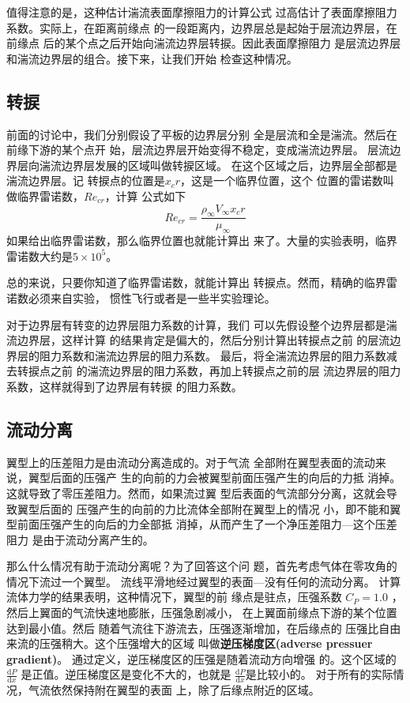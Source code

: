 值得注意的是，这种估计湍流表面摩擦阻力的计算公式
过高估计了表面摩擦阻力系数。实际上，在距离前缘点
的一段距离内，边界层总是起始于层流边界层，在前缘点
后的某个点之后开始向湍流边界层转捩。因此表面摩擦阻力
是层流边界层和湍流边界层的组合。接下来，让我们开始
检查这种情况。

\subsection{转捩}
前面的讨论中，我们分别假设了平板的边界层分别
全是层流和全是湍流。然后在前缘下游的某个点开
始，层流边界层开始变得不稳定，变成湍流边界层。
层流边界层向湍流边界层发展的区域叫做转捩区域。
在这个区域之后，边界层全部都是湍流边界层。记
转捩点的位置是$x_cr$，这是一个临界位置，这个
位置的雷诺数叫做临界雷诺数，$Re_{cr}$，计算
公式如下
\[
	Re_{cr}=\frac{\rho_\infty V_\infty x_cr}{\mu_\infty}
\]
如果给出临界雷诺数，那么临界位置也就能计算出
来了。大量的实验表明，临界雷诺数大约是$5\times 10^5 $。

总的来说，只要你知道了临界雷诺数，就能计算出
转捩点。然而，精确的临界雷诺数必须来自实验，
惯性飞行或者是一些半实验理论。

对于边界层有转变的边界层阻力系数的计算，我们
可以先假设整个边界层都是湍流边界层，这样计算
的结果肯定是偏大的，然后分别计算出转捩点之前
的层流边界层的阻力系数和湍流边界层的阻力系数。
最后，将全湍流边界层的阻力系数减去转捩点之前
的湍流边界层的阻力系数，再加上转捩点之前的层
流边界层的阻力系数，这样就得到了边界层有转捩
的阻力系数。

\subsection{流动分离}
翼型上的压差阻力是由流动分离造成的。对于气流
全部附在翼型表面的流动来说，翼型后面的压强产
生的向前的力会被翼型前面压强产生的向后的力抵
消掉。这就导致了零压差阻力。然而，如果流过翼
型后表面的气流部分分离，这就会导致翼型后面的
压强产生的向前的力比流体全部附在翼型上的情况
小，即不能和翼型前面压强产生的向后的力全部抵
消掉，从而产生了一个净压差阻力---这个压差阻力
是由于流动分离产生的。

那么什么情况有助于流动分离呢？为了回答这个问
题，首先考虑气体在零攻角的情况下流过一个翼型。
流线平滑地经过翼型的表面---没有任何的流动分离。
计算流体力学的结果表明，这种情况下，翼型的前
缘点是驻点，压强系数
$C_P=1.0$
，然后上翼面的气流快速地膨胀，压强急剧减小，
在上翼面前缘点下游的某个位置达到最小值。然后
随着气流往下游流去，压强逐渐增加，在后缘点的
压强比自由来流的压强稍大。这个压强增大的区域
叫做{\bfseries 逆压梯度区(adverse pressuer gradient)}。
通过定义，逆压梯度区的压强是随着流动方向增强
的。这个区域的$\frac{\mathrm{d}P }{\mathrm{d}x}$
是正值。逆压梯度区是变化不大的，也就是
$\frac{\mathrm{d}P }{\mathrm{d}x }$是比较小的。
对于所有的实际情况，气流依然保持附在翼型的表面
上，除了后缘点附近的区域。

